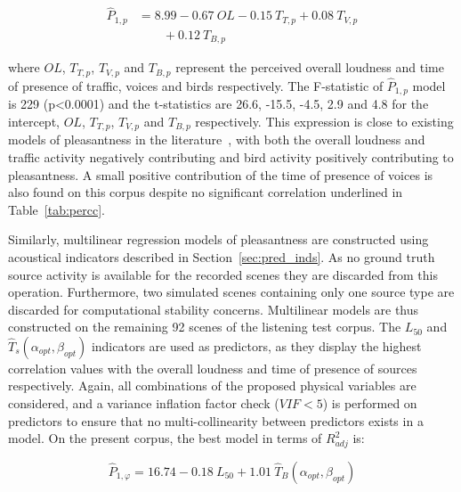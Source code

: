 \documentclass[twocolumn]{article}
\begin{document}
\begin{equation}
\begin{split}
\hat P_{1, p} & = 8.99 - 0.67~OL - 0.15~T_{T, p} + 0.08~T_{V, p}\\
&\qquad + 0.12~T_{B, p} \label{eq:pp1}
\end{split}
\end{equation}

where $OL$, $T_{T, p}$, $T_{V, p}$ and $T_{B, p}$ represent the perceived overall loudness and time of presence of traffic, voices and birds respectively. The F-statistic of $\hat P_{1, p}$ model is 229 (p<0.0001) and the t-statistics are 26.6, -15.5, -4.5, 2.9 and 4.8 for the intercept, $OL$, $T_{T, p}$, $T_{V, p}$ and $T_{B, p}$ respectively. This expression is close to existing models of pleasantness in the literature~\cite{ricciardi2014, aumond2017}, with both the overall loudness and traffic activity negatively contributing and bird activity positively contributing to pleasantness. A small positive contribution of the time of presence of voices is also found on this corpus despite no significant correlation underlined in Table~\ref{tab:percc}.

Similarly, multilinear regression models of pleasantness are constructed using acoustical indicators described in Section~\ref{sec:pred_inds}. As no ground truth source activity is available for the recorded scenes they are discarded from this operation. Furthermore, two simulated scenes containing only one source type are discarded for computational stability concerns. Multilinear models are thus constructed on the remaining 92 scenes of the listening test corpus. The $L_{50}$ and $\hat T_s(\alpha_{opt}, \beta_{opt})$ indicators are used as predictors, as they display the highest correlation values with the overall loudness and time of presence of sources respectively. Again, all combinations of the proposed physical variables are considered, and a variance inflation factor check ($VIF<5$) is performed on predictors to ensure that no multi-collinearity between predictors exists in a model. On the present corpus, the best model in terms of $R^2_{adj}$ is:

\begin{equation}
\hat P_{1, \varphi} = 16.74 - 0.18~L_{50} + 1.01~\hat T_B(\alpha_{opt}, \beta_{opt}) \label{eq:pphi}
\end{equation}
\end{document}
